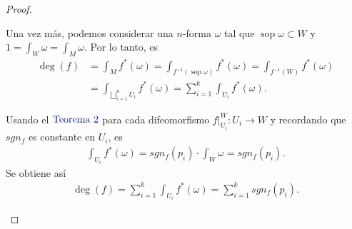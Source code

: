 \documentclass[11pt]{article}
\newcommand{\sop}{\operatorname{sop}}
\newcommand{\paint}[1]{\color{color}{#1}}
\newcommand{\tpaing}[1]{\paint{\text{#1}}}
\begin{document}
\begin{proof}
\begin{itemize}[listparindent = \parindent]
Una vez más, podemos considerar una $n$-forma $\omega$ tal que $\sop \omega \subset W$ y $1 = \int_W \omega= \int_M \omega$. Por lo tanto, es
\begin{align*}
\deg(f) &= \int_Mf^*(\omega) = \int_{f^{-1}(\sop \omega)}f^*(\omega) = \int_{f^{-1}(W)}f^*(\omega)\\
&= \int_{\bigsqcup_{i=1}^nU_i}f^*(\omega) = \sum_{i=1}^k \int_{U_i}f^*(\omega).
\end{align*}

Usando el $\tpaing{Teorema $2$}$ para cada difeomorfismo $f|_{U_i}^W : U_i \to W$ y recordando que $sgn_f$ es constante en $U_i$, es
\begin{align*}
\int_{U_i}f^*(\omega) = sgn_f(p_i) \cdot \int_W\omega = sgn_f(p_i).
\end{align*}
Se obtiene así
\begin{align*}
\deg(f) = \sum_{i=1}^k \int_{U_i}f^*(\omega) = \sum_{i=1}^k sgn_f(p_i).
\end{align*}
\end{itemize}
\end{proof}
\end{document}
